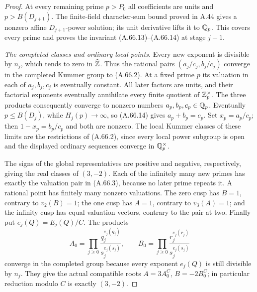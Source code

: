 \begin{proof}
At every remaining prime $p>P_0$ all coefficients are
units and $p>B(D_{j+1})$.  The finite-field character-sum
bound proved in A.44 gives a nonzero affine
$D_{j+1}$-power solution; its unit derivative lifts it
to $\mathbb Q_p$.  This covers every prime and proves the
invariant (A.66.13)--(A.66.14) at stage $j+1$.

\emph{The completed classes and ordinary local points.}
Every new exponent is divisible by $n_j$, which tends
to zero in $\widehat{\mathbb Z}$.  Thus the rational pairs
$(a_j/c_j,b_j/c_j)$ converge in the completed Kummer
group to (A.66.2).  At a fixed prime $p$ its valuation
in each of $a_j,b_j,c_j$ is eventually constant.
All later factors are units, and their factorial
exponents eventually annihilate every finite quotient
of $\mathbb Z_p^\times$.  The three products consequently
converge to nonzero numbers $a_p,b_p,c_p\in\mathbb Q_p$.
Eventually $p\le B(D_j)$, while $H_j(p)\to\infty$,
so (A.66.14) gives $a_p+b_p=c_p$.
Set $x_p=a_p/c_p$; then $1-x_p=b_p/c_p$ and both
are nonzero.  The local Kummer classes of these limits
are the restrictions of (A.66.2), since every local
power subgroup is open and the displayed ordinary
sequences converge in $\mathbb Q_p^\times$.

The signs of the global representatives are positive
and negative, respectively, giving the real classes
of $(3,-2)$.  Each of the infinitely many new primes
has exactly the valuation pair in (A.66.3), because
no later prime repeats it.  A rational point has
finitely many nonzero valuations.  The zero cusp has
$B=1$, contrary to $v_2(B)=1$; the one cusp has
$A=1$, contrary to $v_3(A)=1$; and the infinity cusp
has equal valuation vectors, contrary to the pair at
two.  Finally put $e_j(Q)=E_j(Q)/C$.  The products
\[
 A_0=\prod_{j\ge0}\frac{q_j^{e_j(q_j)}}{s_j^{e_j(s_j)}},
 \qquad
 B_0=\prod_{j\ge0}\frac{r_j^{e_j(r_j)}}{s_j^{e_j(s_j)}}
 \tag{A.66.27}
\]
converge in the completed group because every exponent
$e_j(Q)$ is still divisible by $n_j$.  They give the
actual compatible roots $A=3A_0^C$, $B=-2B_0^C$;
in particular reduction modulo $C$ is exactly $(3,-2)$.
\end{proof}

